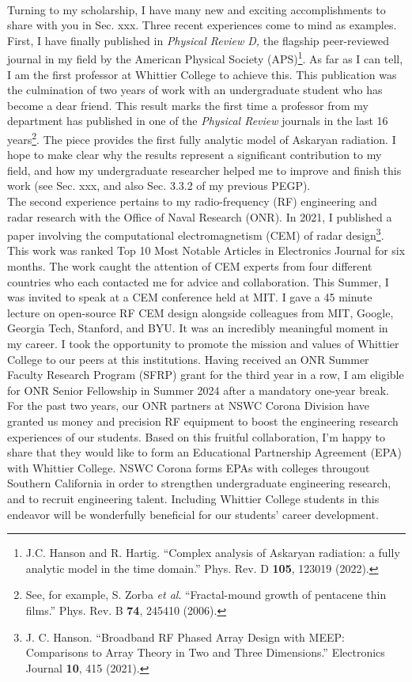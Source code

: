 \documentclass[../../main.tex]{subfiles}
\begin{document}
\\
\vspace{0.25cm}
Turning to my scholarship, I have many new and exciting accomplishments to share with you in Sec. xxx.  Three recent experiences come to mind as examples.  First, I have finally published in \textit{Physical Review D,} the flagship peer-reviewed journal in my field by the American Physical Society (APS)\footnote{J.C. Hanson and R. Hartig. ``Complex analysis of Askaryan radiation: a fully analytic model in the time domain.'' Phys. Rev. D \textbf{105}, 123019 (2022).}.  As far as I can tell, I am the first professor at Whittier College to achieve this.  This publication was the culmination of two years of work with an undergraduate student who has become a dear friend.  This result marks the first time a professor from my department has published in one of the \textit{Physical Review} journals in the last 16 years\footnote{See, for example, S. Zorba \textit{et al}. ``Fractal-mound growth of pentacene thin films.'' Phys. Rev. B \textbf{74}, 245410 (2006).}.  The piece provides the first fully analytic model of Askaryan radiation.  I hope to make clear why the results represent a significant contribution to my field, and how my undergraduate researcher helped me to improve and finish this work (see Sec. xxx, and also Sec. 3.3.2 of my previous PEGP).
\\
\vspace{0.25cm}
The second experience pertains to my radio-frequency (RF) engineering and radar research with the Office of Naval Research (ONR).  In 2021, I published a paper involving the computational electromagnetism (CEM) of radar design\footnote{J. C. Hanson.  ``Broadband RF Phased Array Design with MEEP: Comparisons to Array Theory in Two and Three Dimensions.'' Electronics Journal \textbf{10}, 415 (2021).}.  This work was ranked Top 10 Most Notable Articles in Electronics Journal for six months.  The work caught the attention of CEM experts from four different countries who each contacted me for advice and collaboration.  This Summer, I was invited to speak at a CEM conference held at MIT.  I gave a 45 minute lecture on open-source RF CEM design alongside colleagues from MIT, Google, Georgia Tech, Stanford, and BYU.  It was an incredibly meaningful moment in my career.  I took the opportunity to promote the mission and values of Whittier College to our peers at this institutions.  Having received an ONR Summer Faculty Research Program (SFRP) grant for the third year in a row, I am eligible for ONR Senior Fellowship in Summer 2024 after a mandatory one-year break.  For the past two years, our ONR partners at NSWC Corona Division have granted us money and precision RF equipment to boost the engineering research experiences of our students.  Based on this fruitful collaboration, I'm happy to share that they would like to form an Educational Partnership Agreement (EPA) with Whittier College.  NSWC Corona forms EPAs with colleges througout Southern California in order to strengthen undergraduate engineering research, and to recruit engineering talent.  Including Whittier College students in this endeavor will be wonderfully beneficial for our students' career development.
\end{document}
